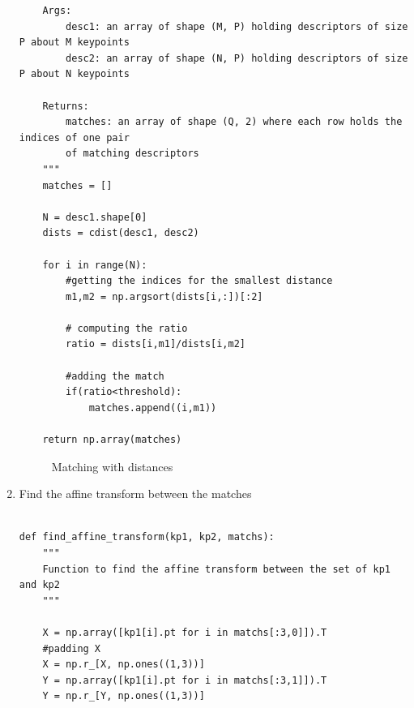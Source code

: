\documentclass[12pt]{article}
\begin{document}
\begin{enumerate}[label=(\alph*)]
\begin{verbatim}
    Args:
        desc1: an array of shape (M, P) holding descriptors of size P about M keypoints
        desc2: an array of shape (N, P) holding descriptors of size P about N keypoints
        
    Returns:
        matches: an array of shape (Q, 2) where each row holds the indices of one pair 
        of matching descriptors
    """
    matches = []
    
    N = desc1.shape[0]
    dists = cdist(desc1, desc2)

    for i in range(N):
        #getting the indices for the smallest distance
        m1,m2 = np.argsort(dists[i,:])[:2]

        # computing the ratio
        ratio = dists[i,m1]/dists[i,m2]

        #adding the match
        if(ratio<threshold):
            matches.append((i,m1))
     
    return np.array(matches)
 \end{verbatim}


\begin{figure}[ht]
  \centering
  \hfill
  \caption{Matching with distances }
\end{figure}

\item  Find the affine transform  between the  matches

 \begin{verbatim}

def find_affine_transform(kp1, kp2, matchs):
    """
    Function to find the affine transform between the set of kp1 and kp2
    """
    
    X = np.array([kp1[i].pt for i in matchs[:3,0]]).T
    #padding X
    X = np.r_[X, np.ones((1,3))]
    Y = np.array([kp1[i].pt for i in matchs[:3,1]]).T
    Y = np.r_[Y, np.ones((1,3))]


\end{verbatim}
\end{enumerate}
\end{document}
